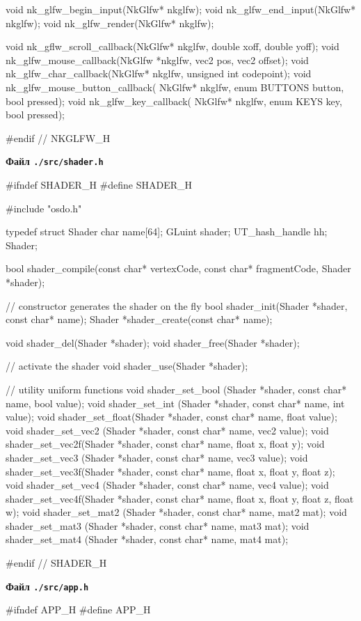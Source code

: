 \documentclass[14pt,a4paper]{extarticle}
\theoremstyle{definition}
\renewcommand{\[}{\begin{singlespace}\begin{equation*}}
\renewcommand{\]}{\end{equation*}\end{singlespace}}
\begin{document}
\begin{multicols}{2}
\begin{ccode}
void nk_glfw_begin_input(NkGlfw* nkglfw);
void nk_glfw_end_input(NkGlfw* nkglfw);
void nk_glfw_render(NkGlfw* nkglfw);

void nk_gflw_scroll_callback(NkGlfw* nkglfw, double xoff, double yoff);
void nk_glfw_mouse_callback(NkGlfw *nkglfw, vec2 pos, vec2 offset);
void nk_glfw_char_callback(NkGlfw* nkglfw, unsigned int codepoint);
void nk_glfw_mouse_button_callback(
        NkGlfw* nkglfw, enum BUTTONS button, bool pressed);
void nk_glfw_key_callback(
        NkGlfw* nkglfw, enum KEYS key, bool pressed);

#endif // NKGLFW_H
\end{ccode}
\noindent\cprotect\textbf{Файл \verb+./src/shader.h+}
\begin{ccode}
#ifndef SHADER_H
#define SHADER_H

#include "osdo.h"

typedef struct Shader {
    char name[64];
    GLuint shader;
    UT_hash_handle hh;
} Shader;

bool shader_compile(const char* vertexCode, const char* fragmentCode,
                    Shader *shader);

// constructor generates the shader on the fly
bool shader_init(Shader *shader, const char* name);
Shader *shader_create(const char* name);

void shader_del(Shader *shader);
void shader_free(Shader *shader);

// activate the shader
void shader_use(Shader *shader);

// utility uniform functions
void shader_set_bool (Shader *shader, const char* name, bool value);
void shader_set_int  (Shader *shader, const char* name, int value);
void shader_set_float(Shader *shader, const char* name, float value);
void shader_set_vec2 (Shader *shader, const char* name, vec2 value);
void shader_set_vec2f(Shader *shader, const char* name,
                      float x, float y);
void shader_set_vec3 (Shader *shader, const char* name, vec3 value);
void shader_set_vec3f(Shader *shader, const char* name,
                      float x, float y, float z);
void shader_set_vec4 (Shader *shader, const char* name, vec4 value);
void shader_set_vec4f(Shader *shader, const char* name,
                      float x, float y, float z, float w);
void shader_set_mat2 (Shader *shader, const char* name, mat2 mat);
void shader_set_mat3 (Shader *shader, const char* name, mat3 mat);
void shader_set_mat4 (Shader *shader, const char* name, mat4 mat);

#endif // SHADER_H
\end{ccode}
\noindent\cprotect\textbf{Файл \verb+./src/app.h+}
\begin{ccode}
#ifndef APP_H
#define APP_H


\end{ccode}
\end{multicols}
\end{document}
